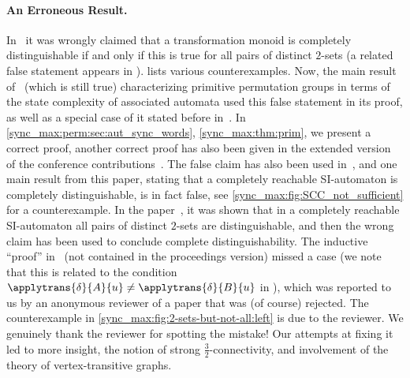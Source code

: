	\paragraph{An Erroneous Result.} In~\cite[Thm.~7]{DBLP:conf/dcfs/Hoffmann21} 
	it was wrongly claimed that a transformation monoid is completely distinguishable
	if and only if this is true for all pairs
	of distinct $2$-sets (a related false statement
	appears in \cite[Lem.~3.1]{DBLP:conf/lata/Hoffmann21}). 
	 lists various counterexamples.
	Now, the main result
	of~\cite[Thm.~12]{DBLP:conf/dcfs/Hoffmann21} (which is still true) characterizing primitive
	permutation groups in terms of the state complexity of associated
	automata used this false statement in its proof,
	as well as a special case of it stated before in~\cite[Prop.~4.8]{DBLP:conf/lata/Hoffmann21}.
	In \cref{sync_max:perm:sec:aut_sync_words}, \cref{sync_max:thm:prim},
    we present a correct proof, another correct proof has also been given in the extended version~\cite[Thm.~6.3]{HoffmannLATAextended2} 
	of the conference contributions~\cite{DBLP:conf/lata/Hoffmann21,DBLP:conf/dcfs/Hoffmann21}.	
	The false claim has also been used in~\cite{DBLP:conf/dcfs/Hoffmann22},
	and one main result from this paper,
	stating that a completely reachable SI-automaton
	is completely distinguishable,
	is in fact false, 
	see \cref{sync_max:fig:SCC_not_sufficient} for a counterexample.
	In the paper~\cite{DBLP:conf/dcfs/Hoffmann22}, it was shown 
	that in a completely reachable SI-automaton
	all pairs of distinct $2$-sets are distinguishable,
	and then the wrong claim has been used to conclude
	complete distinguishability.	
	The inductive ``proof'' in~\cite[Thm.~7]{DBLP:conf/lata/Hoffmann21a} (not contained in the proceedings version)
	missed a case (we note that this is related
	to the condition $\applytrans{\delta}{A}{u} \ne \applytrans{\delta}{B}{u}$
	in ), which
	was reported to us by an anonymous reviewer of a paper that was (of course)
	rejected. The counterexample in \cref{sync_max:fig:2-sets-but-not-all:left} is due to the reviewer.
	We genuinely thank the reviewer for spotting the mistake!
	Our attempts at fixing it led to more insight,
	the notion of strong $\frac{3}{2}$-connectivity, and involvement of the theory of vertex-transitive graphs.